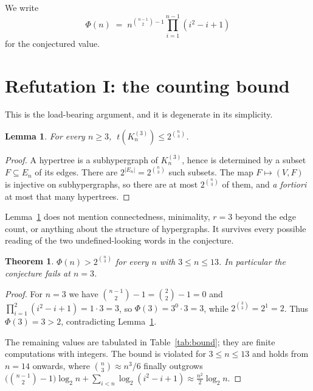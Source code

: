 \documentclass[11pt]{article}
\newtheorem{theorem}{Theorem}
\newtheorem{lemma}{Lemma}
\theoremstyle{remark}
\begin{document}
We write
\[
  \Phi(n) \;=\; n^{\binom{n-1}{2}-1}\prod_{i=1}^{n-1}(i^2-i+1)
\]
for the conjectured value.

\section{Refutation I: the counting bound}

This is the load-bearing argument, and it is degenerate in its simplicity.

\begin{lemma}\label{lem:bound}
For every $n \ge 3$, $\;t(K_n^{(3)}) \le 2^{\binom{n}{3}}$.
\end{lemma}

\begin{proof}
A hypertree is a subhypergraph of $K_n^{(3)}$, hence is determined by a subset
$F \subseteq E_n$ of its edges. There are $2^{|E_n|} = 2^{\binom{n}{3}}$ such
subsets. The map $F \mapsto (V,F)$ is injective on subhypergraphs, so there are
at most $2^{\binom{n}{3}}$ of them, and \emph{a fortiori} at most that many
hypertrees.
\end{proof}

Lemma~\ref{lem:bound} does not mention connectedness, minimality, $r = 3$ beyond
the edge count, or anything about the structure of hypergraphs. It survives every
possible reading of the two undefined-looking words in the conjecture.

\begin{theorem}\label{thm:bound}
$\Phi(n) > 2^{\binom{n}{3}}$ for every $n$ with $3 \le n \le 13$. In particular
the conjecture fails at $n = 3$.
\end{theorem}

\begin{proof}
For $n = 3$ we have $\binom{n-1}{2} - 1 = \binom{2}{2} - 1 = 0$ and
$\prod_{i=1}^{2}(i^2-i+1) = 1 \cdot 3 = 3$, so $\Phi(3) = 3^0 \cdot 3 = 3$,
while $2^{\binom{3}{3}} = 2^1 = 2$. Thus $\Phi(3) = 3 > 2$, contradicting
Lemma~\ref{lem:bound}.

The remaining values are tabulated in Table~\ref{tab:bound}; they are finite
computations with integers. The bound is violated for $3 \le n \le 13$ and holds
from $n = 14$ onwards, where $\binom{n}{3} \approx n^3/6$ finally outgrows
$\bigl(\binom{n-1}{2}-1\bigr)\log_2 n + \sum_{i<n}\log_2(i^2-i+1) \approx
\frac{n^2}{2}\log_2 n$.
\end{proof}
\end{document}
